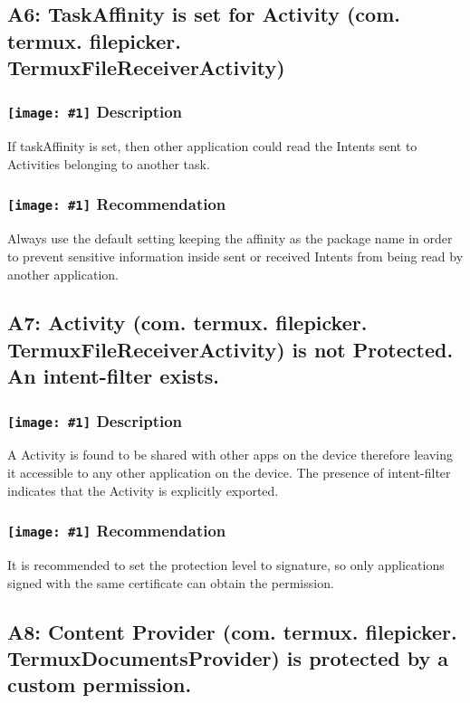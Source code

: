 \documentclass[12p]{article}
\newcommand{\icon}[1]{\texttt{[image: \#1]}}
\begin{document}
\subsection{A6: TaskAffinity is set for Activity (com. termux. filepicker. TermuxFileReceiverActivity)}
\subsubsection*{\protect\icon{/home/miki/Documents/GITHUB/AndroidPermissions/python/vulns/report_icons/basic_sheet.png} Description}
If taskAffinity is set, then other application could read the Intents sent to Activities belonging to another task.
\subsubsection*{\protect\icon{/home/miki/Documents/GITHUB/AndroidPermissions/python/vulns/report_icons/basic_todo.png} Recommendation}
Always use the default setting keeping the affinity as the package name in order to prevent sensitive information inside sent or received Intents  from being read by another application.
\subsection{A7: Activity (com. termux. filepicker. TermuxFileReceiverActivity) is not Protected. An intent-filter exists.}
\subsubsection*{\protect\icon{/home/miki/Documents/GITHUB/AndroidPermissions/python/vulns/report_icons/basic_sheet.png} Description}
A  Activity is found to be shared with other apps on the device therefore leaving it accessible to any other application on the device. The presence of intent-filter indicates that the Activity is explicitly exported.
\subsubsection*{\protect\icon{/home/miki/Documents/GITHUB/AndroidPermissions/python/vulns/report_icons/basic_todo.png} Recommendation}
It is recommended to set the protection level to signature, so only applications signed with the same certificate can obtain the permission.
\subsection{A8: Content Provider (com. termux. filepicker. TermuxDocumentsProvider) is protected by a custom permission.}
\end{document}
